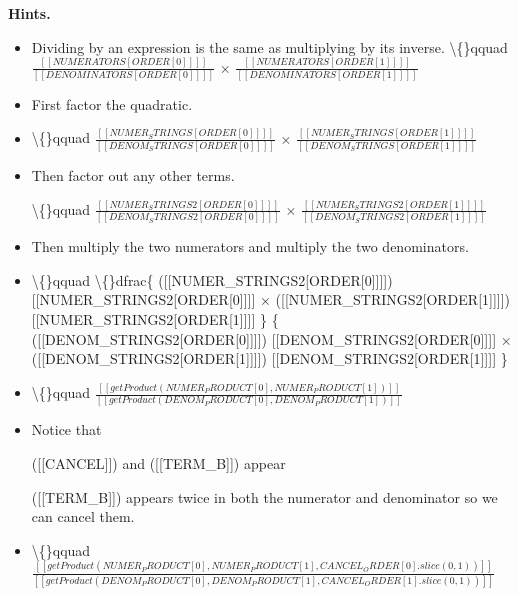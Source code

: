 \documentclass{article}
\begin{document}
\textbf{Hints.}
\begin{itemize}
  \item Dividing by an expression is the same as multiplying by its inverse.
                \textbackslash\{\}qquad
                    $\frac{[[NUMERATORS[ORDER[0]]]]}{[[DENOMINATORS[ORDER[0]]]]}$ $\times$
                    $\frac{[[NUMERATORS[ORDER[1]]]]}{[[DENOMINATORS[ORDER[1]]]]}$
  \item First factor the quadratic.
  \item \textbackslash\{\}qquad
                $\frac{[[NUMER_STRINGS[ORDER[0]]]]}{[[DENOM_STRINGS[ORDER[0]]]]}$ $\times$
                $\frac{[[NUMER_STRINGS[ORDER[1]]]]}{[[DENOM_STRINGS[ORDER[1]]]]}$
  \item Then factor out any other terms.

                \textbackslash\{\}qquad
                    $\frac{[[NUMER_STRINGS2[ORDER[0]]]]}{[[DENOM_STRINGS2[ORDER[0]]]]}$ $\times$
                    $\frac{[[NUMER_STRINGS2[ORDER[1]]]]}{[[DENOM_STRINGS2[ORDER[1]]]]}$
  \item Then multiply the two numerators and multiply the two denominators.
  \item \textbackslash\{\}qquad \textbackslash\{\}dfrac\{
                ([[NUMER\_STRINGS2[ORDER[0]]]])
                [[NUMER\_STRINGS2[ORDER[0]]]] $\times$
                ([[NUMER\_STRINGS2[ORDER[1]]]])
                [[NUMER\_STRINGS2[ORDER[1]]]] \} \{
                ([[DENOM\_STRINGS2[ORDER[0]]]])
                [[DENOM\_STRINGS2[ORDER[0]]]] $\times$
                ([[DENOM\_STRINGS2[ORDER[1]]]])
                [[DENOM\_STRINGS2[ORDER[1]]]] \}
  \item \textbackslash\{\}qquad $\frac{
                [[getProduct(NUMER_PRODUCT[0], NUMER_PRODUCT[1])]]}{
                [[getProduct(DENOM_PRODUCT[0], DENOM_PRODUCT[1])]]}$
  \item Notice that
                
                    ([[CANCEL]]) and ([[TERM\_B]]) appear
                
                ([[TERM\_B]]) appears twice
                in both the numerator and denominator so we can cancel them.
  \item \textbackslash\{\}qquad $\frac{
                    [[getProduct(NUMER_PRODUCT[0], NUMER_PRODUCT[1], CANCEL_ORDER[0].slice(0, 1))]]}{
                    [[getProduct(DENOM_PRODUCT[0], DENOM_PRODUCT[1], CANCEL_ORDER[1].slice(0, 1))]]}$
                


\end{itemize}
\end{document}
